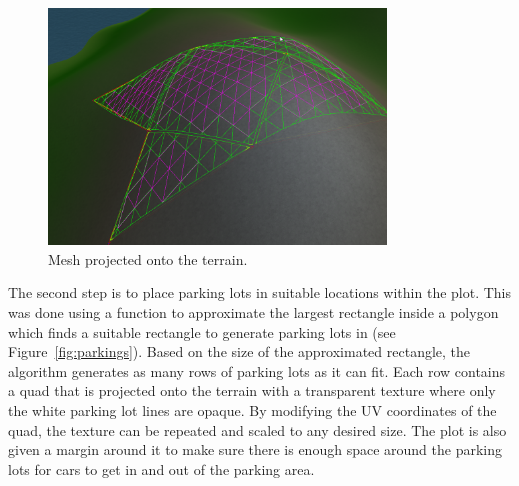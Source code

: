 \begin{figure}[H]
  \centering

  \includegraphics[width=0.8\textwidth]{figure/methods/terrain_projector}
  \caption{Mesh projected onto the terrain.}

  \label{fig:methods_parking_terrain_projector}
\end{figure}

The second step is to place parking lots in suitable locations within the plot.
This was done using a function to approximate the largest rectangle inside a polygon which finds a suitable rectangle to generate parking lots in (see Figure~\ref{fig:parkings}).
Based on the size of the approximated rectangle, the algorithm generates as many rows of parking lots as it can fit.
Each row contains a quad that is projected onto the terrain with a transparent texture where only the white parking lot lines are opaque.
By modifying the UV coordinates of the quad, the texture can be repeated and scaled to any desired size. 
The plot is also given a margin around it to make sure there is enough space around the parking lots for cars to get in and out of the parking area.


